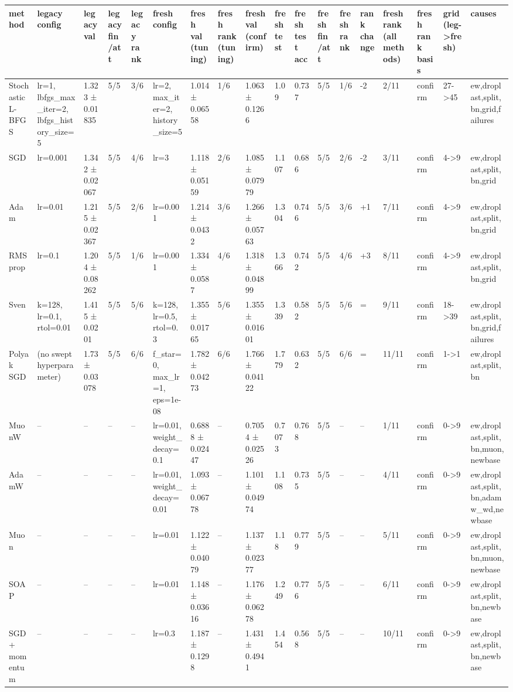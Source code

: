 \begin{tabular}{llllllllllllllllll}
\toprule
method & legacy config & legacy val & legacy fin/att & legacy rank & fresh config & fresh val (tuning) & fresh rank (tuning) & fresh val (confirm) & fresh test & fresh test acc & fresh fin/att & fresh rank & rank change & fresh rank (all methods) & fresh rank basis & grid (leg->fresh) & causes \\
\midrule
Stochastic L-BFGS & lr=1, lbfgs\_max\_iter=2, lbfgs\_history\_size=5 & 1.323 ± 0.01835 & 5/5 & 3/6 & lr=2, max\_iter=2, history\_size=5 & 1.014 ± 0.06558 & 1/6 & 1.063 ± 0.1266 & 1.09 & 0.737 & 5/5 & 1/6 & -2 & 2/11 & confirm & 27->45 & ew,droplast,split,bn,grid,failures \\
SGD & lr=0.001 & 1.342 ± 0.02067 & 5/5 & 4/6 & lr=3 & 1.118 ± 0.05159 & 2/6 & 1.085 ± 0.07979 & 1.107 & 0.686 & 5/5 & 2/6 & -2 & 3/11 & confirm & 4->9 & ew,droplast,split,bn,grid \\
Adam & lr=0.01 & 1.215 ± 0.02367 & 5/5 & 2/6 & lr=0.001 & 1.214 ± 0.0432 & 3/6 & 1.266 ± 0.05763 & 1.304 & 0.746 & 5/5 & 3/6 & +1 & 7/11 & confirm & 4->9 & ew,droplast,split,bn,grid \\
RMSprop & lr=0.1 & 1.204 ± 0.08262 & 5/5 & 1/6 & lr=0.001 & 1.334 ± 0.0587 & 4/6 & 1.318 ± 0.04899 & 1.366 & 0.742 & 5/5 & 4/6 & +3 & 8/11 & confirm & 4->9 & ew,droplast,split,bn,grid \\
Sven & k=128, lr=0.1, rtol=0.01 & 1.415 ± 0.0201 & 5/5 & 5/6 & k=128, lr=0.5, rtol=0.3 & 1.355 ± 0.01765 & 5/6 & 1.355 ± 0.01601 & 1.339 & 0.582 & 5/5 & 5/6 & = & 9/11 & confirm & 18->39 & ew,droplast,split,bn,grid,failures \\
Polyak SGD & (no swept hyperparameter) & 1.73 ± 0.03078 & 5/5 & 6/6 & f\_star=0, max\_lr=1, eps=1e-08 & 1.782 ± 0.04273 & 6/6 & 1.766 ± 0.04122 & 1.779 & 0.632 & 5/5 & 6/6 & = & 11/11 & confirm & 1->1 & ew,droplast,split,bn \\
MuonW & -- & -- & -- & -- & lr=0.01, weight\_decay=0.1 & 0.6888 ± 0.02447 & -- & 0.7054 ± 0.02526 & 0.7073 & 0.768 & 5/5 & -- & -- & 1/11 & confirm & 0->9 & ew,droplast,split,bn,muon,newbase \\
AdamW & -- & -- & -- & -- & lr=0.01, weight\_decay=0.01 & 1.093 ± 0.06778 & -- & 1.101 ± 0.04974 & 1.108 & 0.735 & 5/5 & -- & -- & 4/11 & confirm & 0->9 & ew,droplast,split,bn,adamw\_wd,newbase \\
Muon & -- & -- & -- & -- & lr=0.01 & 1.122 ± 0.04079 & -- & 1.137 ± 0.02377 & 1.18 & 0.779 & 5/5 & -- & -- & 5/11 & confirm & 0->9 & ew,droplast,split,bn,muon,newbase \\
SOAP & -- & -- & -- & -- & lr=0.01 & 1.148 ± 0.03616 & -- & 1.176 ± 0.06278 & 1.249 & 0.776 & 5/5 & -- & -- & 6/11 & confirm & 0->9 & ew,droplast,split,bn,newbase \\
SGD + momentum & -- & -- & -- & -- & lr=0.3 & 1.187 ± 0.1298 & -- & 1.431 ± 0.4941 & 1.454 & 0.568 & 5/5 & -- & -- & 10/11 & confirm & 0->9 & ew,droplast,split,bn,newbase \\
\bottomrule
\end{tabular}
